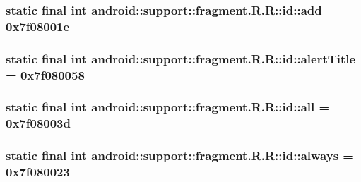 \hypertarget{classandroid_1_1support_1_1fragment_1_1_r_1_1id_9c58c44ffff5078cb4140300fabe23b5}{
\subsubsection[{add}]{\setlength{\rightskip}{0pt plus 5cm}static final int android::support::fragment.R.R::id::add = 0x7f08001e}}
\label{classandroid_1_1support_1_1fragment_1_1_r_1_1id_9c58c44ffff5078cb4140300fabe23b5}


\hypertarget{classandroid_1_1support_1_1fragment_1_1_r_1_1id_2694d17102fc654805d5ecf978889fe1}{
\subsubsection[{alertTitle}]{\setlength{\rightskip}{0pt plus 5cm}static final int android::support::fragment.R.R::id::alertTitle = 0x7f080058}}
\label{classandroid_1_1support_1_1fragment_1_1_r_1_1id_2694d17102fc654805d5ecf978889fe1}


\hypertarget{classandroid_1_1support_1_1fragment_1_1_r_1_1id_0615fd5014b8424980b9f8bf06bb7300}{
\subsubsection[{all}]{\setlength{\rightskip}{0pt plus 5cm}static final int android::support::fragment.R.R::id::all = 0x7f08003d}}
\label{classandroid_1_1support_1_1fragment_1_1_r_1_1id_0615fd5014b8424980b9f8bf06bb7300}


\hypertarget{classandroid_1_1support_1_1fragment_1_1_r_1_1id_c8794ae0a927dc802c6b68d3f8192c97}{
\subsubsection[{always}]{\setlength{\rightskip}{0pt plus 5cm}static final int android::support::fragment.R.R::id::always = 0x7f080023}}
\label{classandroid_1_1support_1_1fragment_1_1_r_1_1id_c8794ae0a927dc802c6b68d3f8192c97}


